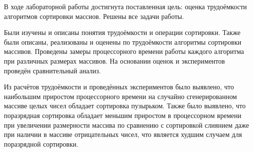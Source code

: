 В ходе лабораторной работы достигнута поставленная цель: оценка трудоёмкости алгоритмов сортировки массиов. Решены все задачи работы.

Были изучены и описаны понятия трудоёмкости и операции сортировки. Также были описаны, реализованы и оценены по трудоёмкости алгоритмы сортировки массивов. Проведены замеры процессорного времени работы каждого алгоритма при различных размерах массивов. На основании оценок и экспериментов проведён сравнительный анализ.

Из расчётов трудоёмкости и проведённых экспериментов было выявлено, что наибольшим приростом процессорного времени на случайно сгенерированном массиве целых чисел обладает сортировка пузырьком. Также было выявлено, что поразрядная сортировка обладает меньшим приростом в процессорном времени при увеличении размерности массива по сравнению с сортировкой слиянием даже при наличии в массиве отрицательных чисел, что является худшим случаем для поразрядной сортировки.